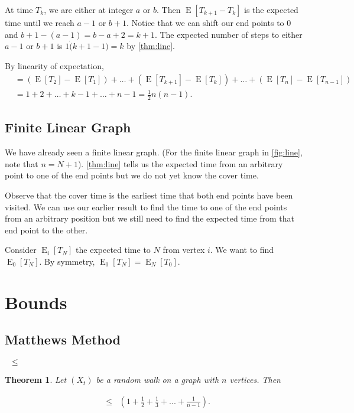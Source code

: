 \documentclass[12pt]{article}
\newtheorem{theorem}{Theorem}
\theoremstyle{definition}
\DeclareMathOperator{\E}{\mathrm{E}}		%
\DeclareMathOperator{\cov}{t_\textrm{cov}}  %
\DeclareMathOperator{\hit}{t_{\textrm{hit}}}%
\begin{document}
At time $T_{k}$, we are either at integer $a$ or $b$.
Then $\E[T_{k+1}-T_{k}]$ is the expected time until we reach $a-1$ or $b+1$.
Notice that we can shift our end points to 0 and $b+1-(a-1) = b-a + 2 = k+1$.
The expected number of steps to either $a-1$ or $b+1$
is $1\dot (k+1-1) = k$ by \cref{thm:line}.

By linearity of expectation,
\begin{align}
\cov &=  (\E[T_2] - \E[T_1]) + \dots +
(\E[T_{k+1}] - \E[T_{k}]) + \dots + (\E[T_n] - \E[T_{n-1}]) \nonumber\\
&= 1 + 2 + \dots + k-1 + \dots + n-1  = \frac{1}{2}n(n-1). \nonumber
\end{align}

\subsection{Finite Linear Graph}
We have already seen a finite linear graph.
(For the finite linear graph in \cref{fig:line}, note that $n=N+1$).
\cref{thm:line} tells us the expected time from an arbitrary point to
one of the end points but we do not yet know the cover time.

Observe that the cover time is the earliest time that both end points 
have been visited.
We can use our earlier result to find the time to one of the end points
from an arbitrary position but we still need to find the expected time
from that end point to the other.

Consider $\E_i[T_N]$ the expected time to $N$ from vertex $i$.
We want to find $\E_0[T_N]$. By symmetry, $\E_0[T_N] = \E_N[T_0]$.



\section{Bounds}
\subsection{Matthews Method}


$\hit \leq \cov$

\begin{theorem}
Let $(X_t)$ be a random walk on a graph with $n$ vertices. Then \label{thm:matthews}
\end{theorem}
\begin{align}
\cov &\leq \hit \left(1 + \frac{1}{2} + \frac{1}{3} + ... + \frac{1}{n-1} \right). \nonumber
\end{align}
\end{document}
